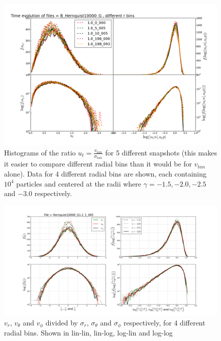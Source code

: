 \begin{figure}
\centering
\includegraphics[width=1.0\linewidth]{img/Time_evolution_B_vt_different_rbins.png}
\caption{Histograms of the ratio $ u_t = \frac{v_{tan}}{\sigma_{tan}} $ for 5 different snapshots (this makes it easier to compare different radial bins than it would be for $ v_{tan} $ alone). Data for 4 different radial bins are shown, each containing $10^4$ particles and centered at the radii where $\gamma = -1.5, -2.0, -2.5 $ and $-3.0 $ respectively.}
\label{fig:test}
\end{figure}


\begin{figure}
\centering
\includegraphics[width=1.0\linewidth]{img/1.png}
\caption{$v_{r}$, $v_{\theta}$ and $v_{\phi}$ divided by $\sigma_{r}$, $\sigma_{\theta}$ and $\sigma_{\phi}$ respectively, for 4 different radial bins. Shown in lin-lin, lin-log, log-lin and log-log}
\label{fig:test}
\end{figure}

